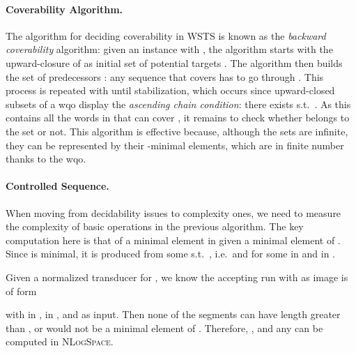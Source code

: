 \paragraph{Coverability Algorithm.}  
The algorithm for deciding coverability in WSTS is known as
the \emph{backward coverability} algorithm: given an instance
 with , the algorithm starts with the
upward-closure  of  as initial set of potential
targets .  The algorithm then builds the set of predecessors
: any
sequence that covers  has to go through .  This process is
repeated with  until
stabilization, which occurs since upward-closed subsets of a wqo
display the
\emph{ascending chain condition}: there exists 
s.t.\ .  As this  contains all the words in
 that can cover , it remains to check whether 
belongs to the set or not.
This algorithm is effective because, although the sets  are
infinite, they can be represented by their -minimal elements,
which are in finite number thanks to the wqo.

\paragraph{Controlled Sequence.}
When moving from decidability issues to complexity ones, we need to
measure the complexity of basic operations in the previous algorithm.
The key computation here is that of a minimal element  in 
given a minimal element  of .  Since  is minimal,
it is produced from some  s.t.\
, i.e.\  and
 for some  in  and
 in .

Given  a normalized transducer
for , we know the accepting run with  as image is of form

with  in ,  in , and  as input.  Then none of the segments
 can have length greater than ,
or  would not be a minimal element of .  Therefore,
, and any  can be computed
in \textsc{NLogSpace}.

